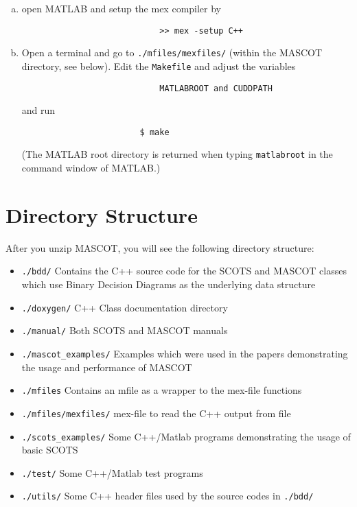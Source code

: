 \documentclass[a4paper]{article}
\newcommand{\mascot}{\textsf{MASCOT}\xspace}
\newcommand{\scots}{\textsf{SCOTS}\xspace}
\begin{document}
\begin{enumerate}
				\begin{enumerate}[(a)]
					\item open MATLAB and setup the mex compiler by
						\begin{verbatim}
							>> mex -setup C++
						\end{verbatim}
					\item Open a terminal and go to \texttt{./mfiles/mexfiles/} (within the \mascot directory, see below). Edit the \texttt{Makefile} and adjust the variables
						\begin{verbatim}
							MATLABROOT and CUDDPATH
						\end{verbatim}
						and run 
						\begin{verbatim}
						$ make
						\end{verbatim}
						(The MATLAB root directory is returned when typing \texttt{matlabroot} in the command window of MATLAB.)
				\end{enumerate}
		\end{enumerate}
	\section{Directory Structure}
	After you unzip \mascot, you will see the following directory structure:
		\begin{itemize}
			\item \texttt{./bdd/} Contains the C++ source code for the \scots and \mascot classes which use Binary Decision Diagrams as the underlying data structure
			\item \texttt{./doxygen/} C++ Class documentation directory
			\item \texttt{./manual/} Both \scots and \mascot manuals
			\item \texttt{./mascot\_examples/} Examples which were used in the papers \cite{hsu2018lazy1, hsu2018lazy2} demonstrating the usage and performance of \mascot 
			\item \texttt{./mfiles} Contains an mfile as a wrapper to the mex-file functions
			\item \texttt{./mfiles/mexfiles/} mex-file to read the C++ output from file
			\item \texttt{./scots\_examples/} Some C++/Matlab programs demonstrating the usage of basic \scots
			\item \texttt{./test/} Some C++/Matlab test programs
			\item \texttt{./utils/} Some C++ header files used by the source codes in \texttt{./bdd/}
		\end{itemize}
\end{document}
